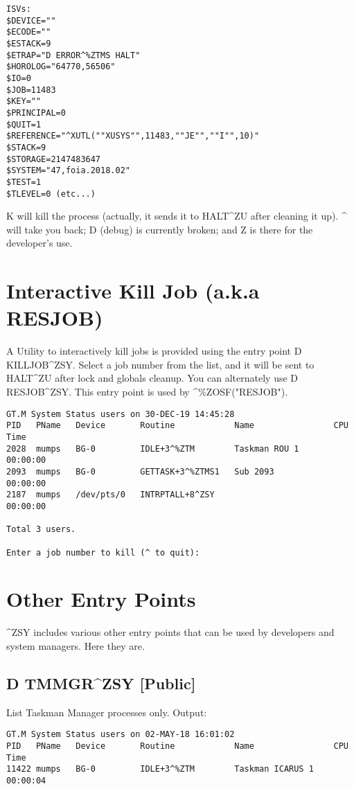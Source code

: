 \documentclass[]{article}
\begin{document}
\lstset{
	caption=ISV List
}
\begin{lstlisting}
ISVs: 
$DEVICE=""
$ECODE=""
$ESTACK=9
$ETRAP="D ERROR^%ZTMS HALT"
$HOROLOG="64770,56506"
$IO=0
$JOB=11483
$KEY=""
$PRINCIPAL=0
$QUIT=1
$REFERENCE="^XUTL(""XUSYS"",11483,""JE"",""I"",10)"
$STACK=9
$STORAGE=2147483647
$SYSTEM="47,foia.2018.02"
$TEST=1
$TLEVEL=0 (etc...)
\end{lstlisting}

K will kill the process (actually, it sends it to HALT\^{}ZU after cleaning it up). \^{} will take you back; D (debug) is currently broken; and Z is there for the developer's use.

\pagebreak

\section{Interactive Kill Job (a.k.a RESJOB)}
A Utility to interactively kill jobs is provided using the entry point D KILLJOB\^{}ZSY. Select a job number from the list, and it will be sent to HALT\^{}ZU after lock and globals cleanup. You can alternately use D RESJOB\^{}ZSY. This entry point is used by \^{}\%ZOSF("RESJOB").

\begin{lstlisting}
GT.M System Status users on 30-DEC-19 14:45:28
PID   PName   Device       Routine            Name                CPU Time
2028  mumps   BG-0         IDLE+3^%ZTM        Taskman ROU 1       00:00:00
2093  mumps   BG-0         GETTASK+3^%ZTMS1   Sub 2093            00:00:00
2187  mumps   /dev/pts/0   INTRPTALL+8^ZSY                        00:00:00

Total 3 users.

Enter a job number to kill (^ to quit): 
\end{lstlisting}

\pagebreak

\section{Other Entry Points}
\^{}ZSY includes various other entry points that can be used by developers and system managers. Here they are.

\subsection{D TMMGR\^{}ZSY [Public]}
List Taskman Manager processes only. Output:
\lstset{
	caption=TMMGR Entry Point
}
\begin{lstlisting}
GT.M System Status users on 02-MAY-18 16:01:02
PID   PName   Device       Routine            Name                CPU Time
11422 mumps   BG-0         IDLE+3^%ZTM        Taskman ICARUS 1    00:00:04
\end{lstlisting}
\end{document}
